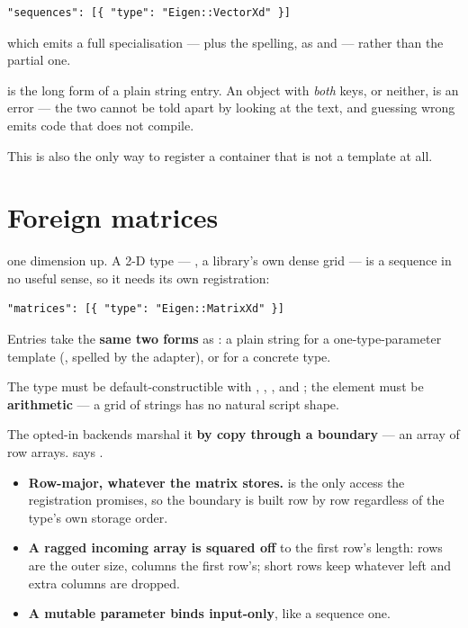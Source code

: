 \begin{lstlisting}[style=json]
"sequences": [{ "type": "Eigen::VectorXd" }]
\end{lstlisting}

which emits a full specialisation --- plus the spelling, as
 and  --- rather
than the partial one.

 is the long form of a plain string entry.
An object with \emph{both} keys, or neither, is an error --- the two cannot be
told apart by looking at the text, and guessing wrong emits code that does not
compile.

This is also the only way to register a container that is not a template at all.

\section{Foreign matrices}
\label{sec:matrices}

 one dimension up. A 2-D type --- , a
library's own dense grid --- is a sequence in no useful sense, so it needs its
own registration:

\begin{lstlisting}[style=json]
"matrices": [{ "type": "Eigen::MatrixXd" }]
\end{lstlisting}

Entries take the \textbf{same two forms} as : a plain string
for a one-type-parameter template (, spelled
 by the adapter), or  for
a concrete type.

The type must be default-constructible with , ,
,  and ; the element must
be \textbf{arithmetic} --- a grid of strings has no natural script shape.

The opted-in backends marshal it \textbf{by copy through a
 boundary} --- an array of row arrays.
 says .

\begin{itemize}
  \item \textbf{Row-major, whatever the matrix stores.} 
    is the only access the registration promises, so the boundary is built row
    by row regardless of the type's own storage order.
  \item \textbf{A ragged incoming array is squared off} to the first row's
    length: rows are the outer size, columns the first row's; short rows keep
    whatever  left and extra columns are dropped.
  \item \textbf{A mutable  parameter binds input-only}, like a
    sequence one.
\end{itemize}

